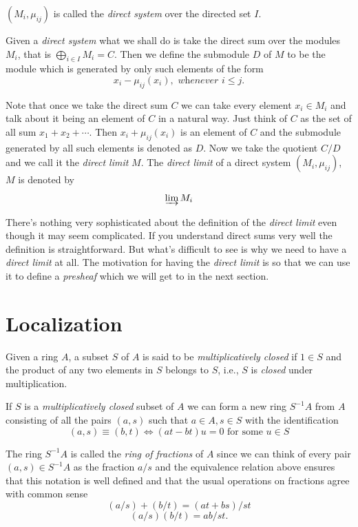 \documentclass[]{report}
\newcommand\byS{S^{-1}}
\begin{document}
$(M_i,\mu_{ij})$ is called the \textit{direct system} over the directed set $I$.

Given a \textit{direct system} what we shall do is take the direct sum over the modules $M_i$, that is $\bigoplus_{i\in I} M_i = C$. Then we define the submodule $D$ of $M$ to be the module which is generated by only such elements of the form
$$x_i - \mu_{ij}(x_i), \textit{ whenever } i\leq j.$$

Note that once we take the direct sum $C$ we can take every element $x_i\in M_i$ and talk about it being an element of $C$ in a natural way. Just think of $C$ as the set of all sum $x_1  + x_2 + \cdots$. Then $x_i + \mu_{ij}(x_i)$ is an element of $C$ and the submodule generated by all such elements is denoted as $D$. Now we take the quotient $C/D$ and we call it the \textit{direct limit} $M$. The \textit{direct limit} of a direct system $(M_i, \mu_{ij})$, $M$ is denoted by
    $$\varinjlim M_i$$

There's nothing very sophisticated about the definition of the \textit{direct limit} even though it may seem complicated. If you understand direct sums very well the definition is straightforward. But what's difficult to see is why we need to have a \textit{direct limit} at all. The motivation for having the \textit{direct limit} is so that we can use it to define a \textit{presheaf} which we will get to in the next section. 


\chapter{Localization}

Given a ring $A$, a subset $S$ of $A$ is said to be \textit{multiplicatively closed} if $1\in S$ and the product of any two elements in $S$ belongs to $S$, i.e., $S$ is \textit{closed} under multiplication. 

If $S$ is a \textit{multiplicatively closed} subset of $A$ we can form a new ring $\byS A$ from $A$ consisting of all the pairs $(a,s)$ such that $a\in A, s\in S$ with the identification
    $$(a,s) \equiv (b,t) \Leftrightarrow (at - bt)u = 0 \text{ for some } u \in S$$

    The ring $\byS A$ is called the \textit{ring of fractions} of $A$ since we can think of every pair $(a,s) \in \byS A$ as the fraction $a/s$ and the equivalence relation above ensures that this notation is well defined and that the usual operations on fractions agree with common sense
    $$(a/s) + (b/t) = (at + bs)/st$$
    $$(a/s)(b/t) = ab/st.$$
\end{document}
